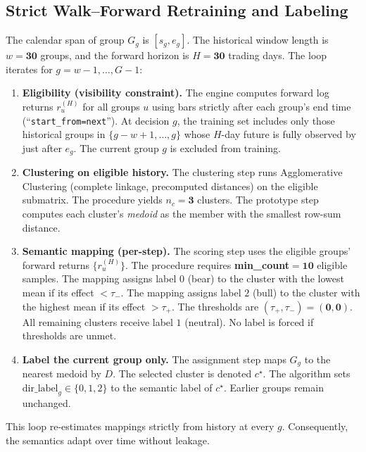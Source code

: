 \subsection{Strict Walk--Forward Retraining and Labeling}\label{sec:wfstrict}
The calendar span of group $G_g$ is $[s_g,e_g]$. The historical window length is $w=\mathbf{30}$ groups, and the forward horizon is $H=\mathbf{30}$ trading days. The loop iterates for $g=w\!-\!1,\ldots,G\!-\!1$:

\begin{enumerate}[leftmargin=1.2em,itemsep=2pt,topsep=2pt]
\item \textbf{Eligibility (visibility constraint).}
The engine computes forward log returns $r^{(H)}_u$ for all groups $u$ using bars strictly after each group’s end time (``\texttt{start\_from=next}''). At decision $g$, the training set includes only those historical groups in $\{g-w+1,\ldots,g\}$ whose $H$-day future is fully observed by just after $e_g$. The current group $g$ is excluded from training.

\item \textbf{Clustering on eligible history.}
The clustering step runs Agglomerative Clustering (complete linkage, precomputed distances) on the eligible submatrix. The procedure yields $n_c=\mathbf{3}$ clusters. The prototype step computes each cluster’s \emph{medoid} as the member with the smallest row-sum distance.

\item \textbf{Semantic mapping (per-step).}
The scoring step uses the eligible groups’ forward returns $\{r^{(H)}_u\}$. The procedure requires \textbf{min\_count}$=\mathbf{10}$ eligible samples. The mapping assigns label $0$ (bear) to the cluster with the lowest mean if its effect $<\tau_{-}$. The mapping assigns label $2$ (bull) to the cluster with the highest mean if its effect $>\tau_{+}$. The thresholds are $(\tau_{+},\tau_{-})=(\mathbf{0},\mathbf{0})$. All remaining clusters receive label $1$ (neutral). No label is forced if thresholds are unmet.

\item \textbf{Label the current group only.}
The assignment step maps $G_g$ to the nearest medoid by $D$. The selected cluster is denoted $c^\star$. The algorithm sets $\mathrm{dir\_label}_g\in\{0,1,2\}$ to the semantic label of $c^\star$. Earlier groups remain unchanged.
\end{enumerate}

This loop re-estimates mappings strictly from history at every $g$. Consequently, the semantics adapt over time without leakage.

